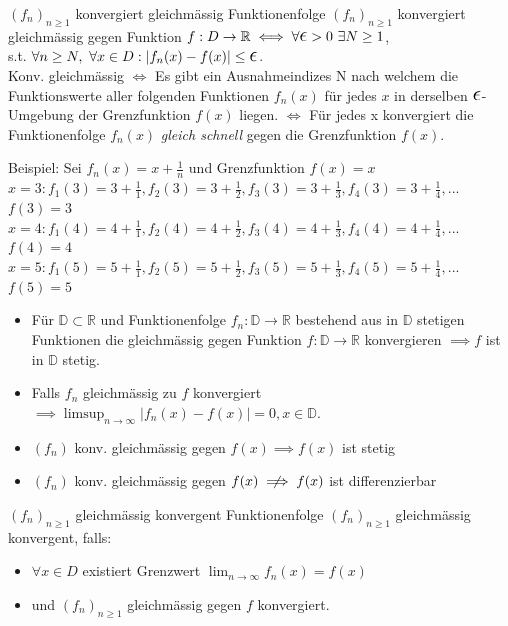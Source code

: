 \documentclass[a4paper]{article}
\let\oldepsilon\epsilon
\renewcommand{\epsilon}{\text{\Large $\oldepsilon$}}
\def\limn{\lim_{n\to \infty}}
\newcommand\R{\ensuremath{\mathbb{R}}}
\newcommand\notimplies{\centernot\implies}
\begin{document}
\begin{mainbox}{$(f_n)_{n \geqslant 1}$ konvergiert gleichmässig}
  Funktionenfolge $(f_n)_{n \geqslant 1}$ konvergiert gleichmässig gegen Funktion $f: D \to \R \iff \forall \epsilon > 0 \ \exists N \ge 1$,  \\ 
   s.t. $\forall n \ge N, \ \forall x \in D: | f_n(x) - f(x) | \le \epsilon$. \\
   \tiny \color{gray}
      Konv. gleichmässig $\iff$ Es gibt ein Ausnahmeindizes N nach welchem die Funktionswerte aller folgenden Funktionen $f_n(x)$ für jedes $x$ in derselben $\epsilon$-Umgebung der Grenzfunktion $f(x)$ liegen.
      $\iff$ Für jedes x konvergiert die Funktionenfolge $f_n(x)$ \textit{gleich schnell} gegen die Grenzfunktion $f(x)$. 
    \normalsize \color{black}
\end{mainbox}
\tiny \color{gray}
  Beispiel: Sei $f_n(x) = x + \frac{1}{n}$ und Grenzfunktion $f(x) = x$\\
  $x = 3: f_1(3)= 3 + \frac{1}{1}, f_2(3) = 3 + \frac{1}{2}, f_3(3) = 3 + \frac{1}{3}, f_4(3) = 3 + \frac{1}{4},...$ \qquad $f(3) = 3$ \\
  $x = 4: f_1(4)= 4 + \frac{1}{1}, f_2(4) = 4 + \frac{1}{2}, f_3(4) = 4 + \frac{1}{3}, f_4(4) = 4 + \frac{1}{4},...$ \qquad $f(4) = 4$ \\
  $x = 5: f_1(5)= 5 + \frac{1}{1}, f_2(5) = 5 + \frac{1}{2}, f_3(5) = 5 + \frac{1}{3}, f_4(5) = 5 + \frac{1}{4},...$ \qquad $f(5) = 5$ \\
\normalsize \color{black}

\begin{itemize}[leftmargin=4.5mm, topsep=1pt, parsep=1pt] 
  \item Für $\mathbb{D} \subset \R$ und Funktionenfolge $f_n:\mathbb{D} \to \R$ bestehend aus in $\mathbb{D}$ stetigen Funktionen die gleichmässig gegen Funktion $f: \mathbb{D} \to \R$ konvergieren $\implies f$ ist in $\mathbb{D}$ stetig.
  \item Falls $f_n$ gleichmässig zu $f$ konvergiert \\
          \qquad $\implies \limsup_{n \to \infty} \left| f_n(x) - f(x) \right| = 0, x \in \mathbb{D}$.
  \item $(f_n)$ konv. gleichmässig gegen $f(x) \implies f(x)$ ist stetig
  \item $(f_n)$ konv. gleichmässig gegen $f(x) \notimplies f(x)$ ist differenzierbar
\end{itemize}

\begin{mainbox}{$(f_n)_{n \geqslant 1}$ gleichmässig konvergent}
  Funktionenfolge $(f_n)_{n \geqslant 1}$ gleichmässig konvergent, falls: 
  \begin{itemize}[leftmargin=4.5mm, topsep=1pt, parsep=1pt]
    \item $\forall x\in D$ existiert Grenzwert $\limn f_n(x) = f(x)$
    \item und $(f_n)_{n \geqslant 1}$ gleichmässig gegen $f$ konvergiert.
  \end{itemize}
\end{mainbox}
\end{document}
